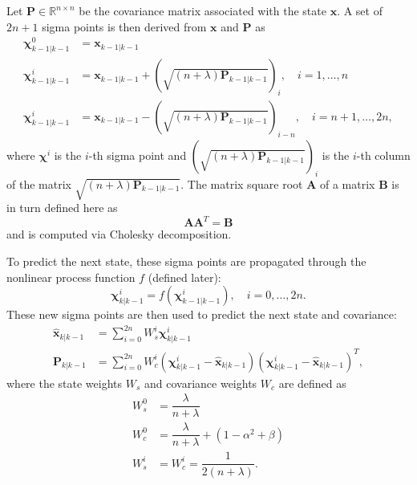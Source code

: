 Let $\mathbf{P} \in \mathbb{R}^{n \times n}$ be the covariance matrix associated with the state $\mathbf{x}$. A set of $2n + 1$ sigma points is then derived from $\mathbf{x}$ and $\mathbf{P}$ as
%
\begin{align}
\mathbf{\chi}^{0}_{k-1 | k-1} &= \mathbf{x}_{k-1 | k-1} \nonumber\\
\mathbf{\chi}^{i}_{k-1 | k-1} &= \mathbf{x}_{k-1 | k-1} + \left( \sqrt{\left( n + \lambda \right) \mathbf{P}_{k-1 | k-1}} \right)_{i}, \quad i = 1, \dots, n \\
\mathbf{\chi}^{i}_{k-1 | k-1} &= \mathbf{x}_{k-1 | k-1} - \left( \sqrt{\left( n + \lambda \right) \mathbf{P}_{k-1 | k-1}} \right)_{i-n}, \quad i = n+1, \dots, 2n, \nonumber
\end{align}
%
where $\mathbf{\chi}^{i}$ is the $i$-th sigma point and $\left( \sqrt{\left( n + \lambda \right) \mathbf{P}_{k-1 | k-1}} \right)_{i}$ is the $i$-th column of the matrix $\sqrt{\left( n + \lambda \right) \mathbf{P}_{k-1 | k-1}}$. The matrix square root $\mathbf{A}$ of a matrix $\mathbf{B}$ is in turn defined here as
%
\begin{equation}
\mathbf{A} \mathbf{A}^{T} = \mathbf{B}
\end{equation}
%
and is computed via Cholesky decomposition.

To predict the next state, these sigma points are propagated through the nonlinear process function $f$ (defined later):
%
\begin{equation}
\mathbf{\chi}^{i}_{k | k-1} = f \left( \mathbf{\chi}^{i}_{k-1 | k-1} \right), \quad i = 0, \dots, 2n.
\end{equation}
%
These new sigma points are then used to predict the next state and covariance:
%
\begin{align}
\hat{\mathbf{x}}_{k | k-1} &= \sum^{2n}_{i=0} W^{i}_{s} \mathbf{\chi}^{i}_{k | k-1} \\
\mathbf{P}_{k | k-1} &= \sum^{2n}_{i=0} W^{i}_{c} \left( \mathbf{\chi}^{i}_{k | k-1} - \hat{\mathbf{x}}_{k | k-1} \right) \left( \mathbf{\chi}^{i}_{k | k-1} - \hat{\mathbf{x}}_{k | k-1} \right)^{T},
\end{align}
%
where the state weights $W_{s}$ and covariance weights $W_{c}$ are defined as
%
\begin{align}
W^{0}_{s} &= \dfrac{\lambda}{n + \lambda} \nonumber \\
W^{0}_{c} &= \dfrac{\lambda}{n + \lambda} + \left( 1 - \alpha^{2} + \beta \right) \\
W^{i}_{s} &= W^{i}_{c} = \dfrac{1}{2 \left(n + \lambda \right)} . \nonumber
\end{align}

